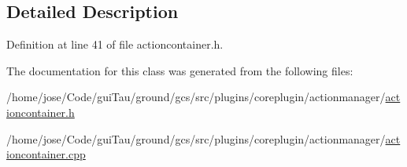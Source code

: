 \subsection{Detailed Description}


Definition at line 41 of file actioncontainer.\-h.



The documentation for this class was generated from the following files\-:\begin{DoxyCompactItemize}
\item 
/home/jose/\-Code/gui\-Tau/ground/gcs/src/plugins/coreplugin/actionmanager/\hyperlink{actioncontainer_8h}{actioncontainer.\-h}\item 
/home/jose/\-Code/gui\-Tau/ground/gcs/src/plugins/coreplugin/actionmanager/\hyperlink{actioncontainer_8cpp}{actioncontainer.\-cpp}\end{DoxyCompactItemize}
